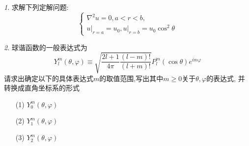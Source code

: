 \documentclass[11pt]{article}
\theoremstyle{remark}
\newtheorem{problem}{}
\begin{document}
\begin{problem}
  求解下列定解问题: 
  $$\left\{\begin{array}{l}
    \nabla^2 u=0, a<r<b, \\ 
    \left.u\right|_{r=a}=u_0,\left.u\right|_{r=b}=u_0 \cos ^2 \theta
  \end{array}\right.$$
\end{problem}


\begin{problem}
  球谐函数的一般表达式为
  $$
  Y_l^m(\theta, \varphi) \equiv \sqrt{\frac{2 l+1}{4 \pi} \frac{(l-m) !}{(l+m) !}} P_l^m(\cos \theta) e^{i m \varphi}
  $$
  请求出确定以下的具体表达式$m$的取值范围,写出其中$m\geq 0$关于$\theta,\varphi$的表达式, 并转换成直角坐标系的形式
  \begin{itemize}
    \item[(1)] $Y_0^m(\theta,\varphi)$
    \item[(2)] $Y_1^m(\theta,\varphi)$
    \item[(3)] $Y_2^m(\theta,\varphi)$
  \end{itemize}
  \end{problem}
\end{document}
